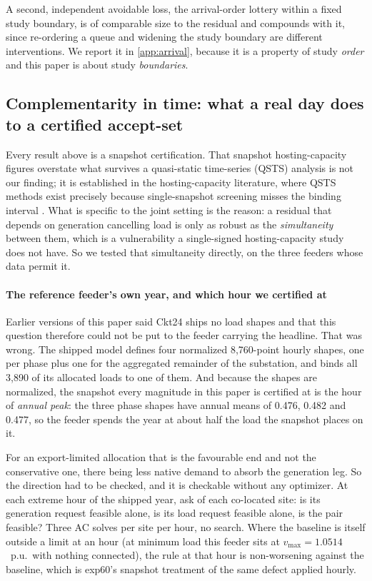 \documentclass[review,authoryear,12pt]{elsarticle}
\begin{document}
A second, independent avoidable loss, the arrival-order lottery within a
fixed study boundary, is of comparable size to the residual and compounds
with it, since re-ordering a queue and widening the study boundary are
different interventions. We report it in \ref{app:arrival}, because it is a
property of study \emph{order} and this paper is about study
\emph{boundaries}.

\subsection{Complementarity in time: what a real day does to a certified accept-set}
\label{sec:time}

Every result above is a snapshot certification. That snapshot hosting-capacity
figures overstate what survives a quasi-static time-series (QSTS) analysis is
not our finding; it is established in the hosting-capacity literature, where
QSTS methods exist precisely because single-snapshot screening misses the
binding interval \citep{jain2019,abideen2020}. What is specific to the joint
setting is the reason: a residual that depends on generation cancelling load is
only as robust as the \emph{simultaneity} between them, which is a
vulnerability a single-signed hosting-capacity study does not have. So we
tested that simultaneity directly, on the three feeders whose data permit it.

\paragraph{The reference feeder's own year, and which hour we certified at}
Earlier versions of this paper said Ckt24 ships no load shapes and that this
question therefore could not be put to the feeder carrying the headline. That
was wrong. The shipped model defines four normalized 8{,}760-point hourly
shapes, one per phase plus one for the aggregated remainder of the
substation, and binds all 3{,}890 of its allocated loads to one of them. And
because the shapes are normalized, the snapshot every magnitude in this paper
is certified at is the hour of \emph{annual peak}: the three phase shapes have
annual means of 0.476, 0.482 and 0.477, so the feeder spends the year at about
half the load the snapshot places on it.

For an export-limited allocation that is the favourable end and not the
conservative one, there being less native demand to absorb the generation leg.
So the
direction had to be checked, and it is checkable without any optimizer. At each
extreme hour of the shipped year, ask of each co-located site: is its
generation request feasible alone, is its load request feasible alone, is the
pair feasible? Three AC solves per site per hour, no search. Where the baseline
is itself outside a limit at an hour (at minimum load this feeder sits at
$v_{\max} = 1.0514$~p.u.\ with nothing connected), the rule at that hour is
non-worsening against the baseline, which is exp60's snapshot treatment of the
same defect applied hourly.
\end{document}
